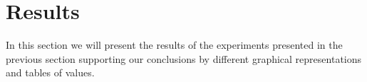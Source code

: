 \section{Results} \label{sec:autocorrelation_results}
In this section we will present the results of the experiments presented in the previous section supporting our conclusions by different graphical representations and tables of values.
